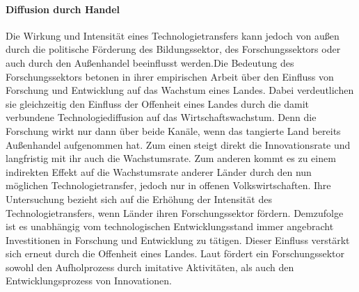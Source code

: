 \paragraph{Diffusion durch Handel}
Die Wirkung und Intensit{\"a}t eines Technologietransfers kann jedoch von au{\ss}en durch die politische F{\"o}rderung des Bildungssektor, des Forschungssektors oder auch durch den Au{\ss}enhandel beeinflusst werden.\newline Die Bedeutung des Forschungssektors betonen \citet{Griffith.2004} in ihrer empirischen Arbeit {\"u}ber den Einfluss von Forschung und Entwicklung auf das Wachstum eines Landes. Dabei verdeutlichen sie gleichzeitig den Einfluss der Offenheit eines Landes durch die damit verbundene Technologiediffusion auf das Wirtschaftswachstum. Denn die Forschung wirkt nur dann {\"u}ber beide Kan{\"a}le, wenn das tangierte Land bereits Au{\ss}enhandel aufgenommen hat. Zum einen steigt direkt die Innovationsrate und langfristig mit ihr auch die Wachstumsrate. Zum anderen kommt es zu einem indirekten Effekt auf die Wachstumsrate anderer L{\"a}nder durch den nun m{\"o}glichen Technologietransfer, jedoch nur in offenen Volkswirtschaften. Ihre Untersuchung bezieht sich auf die Erh{\"o}hung der Intensit{\"a}t des Technologietransfers, wenn L{\"a}nder ihren Forschungssektor f{\"o}rdern. Demzufolge ist es unabh{\"a}ngig vom technologischen Entwicklungsstand immer angebracht Investitionen in Forschung und Entwicklung zu t{\"a}tigen. Dieser Einfluss verst{\"a}rkt sich erneut  durch die Offenheit eines Landes. Laut \citet{Griffith.2004}  f{\"o}rdert ein Forschungssektor sowohl den Aufholprozess durch imitative Aktivit{\"a}ten, als auch den Entwicklungsprozess von Innovationen.\\


